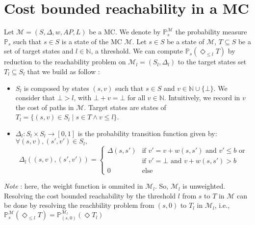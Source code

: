 \section{Cost bounded reachability in a MC}

Let $\mathcal{M} = (S, \Delta, w, AP, L)$ be a MC. We denote by $\mathbb{P}^\mathcal{M}_s$ the probability measure $\mathbb{P}_s$ such that $s \in S$ is a state of the MC $\mathcal{M}$.
Let $s \in S$ be a state of $\mathcal{M}$, $T \subseteq S$ be a set of target states and $l \in \mathbb{N}$, a threshold.
We can compute $\mathbb{P}_s(\Diamond_{\leq l} T)$ by reduction to the reachability problem on $\mathcal{M}_l = (S_l, \Delta_l)$ to the target states set $T_l \subseteq S_l$ that we build as follow :
\begin{itemize}
	\item $S_l$ is composed by states $(s, v)$ such that $s \in S $ and $v \in \mathbb{N} \cup \{ \bot \}$. We consider that $\bot > l$, with $\bot + v = \bot$ for all $v \in \mathbb{N}$. Intuitively, we record in $v$ the cost of paths in $\mathcal{M}$. Target states are states of $T_l = \{ (s, v) \in S_l \; | \; s \in T \wedge v \leq l \}$.
	\item $\Delta_l: S_l \times S_l \rightarrow [0,1]$ is the probability transition function given by:\\
	$\forall (s, v), (s', v') \in S_l,$
	\[
		\Delta_l((s, v), (s', v')) =
		\begin{cases}
		\Delta(s, s') & \text{if $v' = v + w(s, s')$ and $v' \leq b$  or} \\
		 & \text{if $v' = \bot$ and $v + w(s, s') > b$} \\
		 0 & \text{else}
		\end{cases}
	\]
\end{itemize}
\textit{Note} : here, the weight function is ommited in $\mathcal{M}_l$. So, $\mathcal{M}_l$ is unweighted. \\
Resolving the cost bounded reachability by the threshold $l$ from $s$ to $T$ in $\mathcal{M}$ can be done by resolving the reachbility problem from $(s, 0)$ to $T_l$ in $\mathcal{M}_l$, i.e., $\mathbb{P}^\mathcal{M}_s(\Diamond_{\leq l} T) = \mathbb{P}^{\mathcal{M}_l}_{(s, 0)}(\Diamond T_l)$
